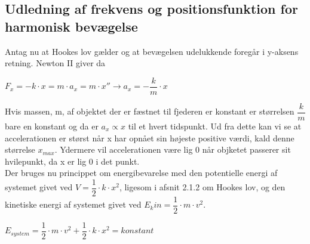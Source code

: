 \subsection{Udledning af frekvens og positionsfunktion for harmonisk bevægelse}

Antag nu at Hookes lov gælder og at bevægelsen udelukkende foregår i y-aksens retning. Newton II giver da 

\bigskip

\begin{center}
$F_x = -k \cdot x = m \cdot a_x = m \cdot x'' \rightarrow a_x = -\dfrac{k}{m} \cdot x$
\end{center}

\bigskip

Hvis massen, m, af objektet der er fæstnet til fjederen er konstant er størrelsen $\dfrac{k}{m}$ bare en konstant og da er $a_x \propto x$ til et hvert tidspunkt. Ud fra dette kan vi se at accelerationen er størst når x har opnået sin højeste positive værdi, kald denne størrelse $x_{max}$. Ydermere vil accelerationen være lig 0 når objketet passerer sit hvilepunkt, da x er lig 0 i det punkt.
\\

Der bruges nu princippet om energibevarelse med den potentielle energi af systemet givet ved $V=\dfrac{1}{2} \cdot k \cdot x^2$, ligesom i afsnit 2.1.2 om Hookes lov, og den kinetiske energi af systemet givet ved $E_kin = \dfrac{1}{2} \cdot m \cdot v^2$.

\bigskip

\begin{center}
$E_{system}=\dfrac{1}{2} \cdot m \cdot v^2 + \dfrac{1}{2} \cdot k \cdot x^2 = konstant$

\end{center}


\bigskip

